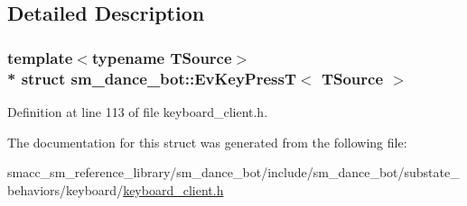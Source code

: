 \subsection{Detailed Description}
\subsubsection*{template$<$typename T\+Source$>$\\*
struct sm\+\_\+dance\+\_\+bot\+::\+Ev\+Key\+Press\+T$<$ T\+Source $>$}



Definition at line 113 of file keyboard\+\_\+client.\+h.



The documentation for this struct was generated from the following file\+:\begin{DoxyCompactItemize}
\item 
smacc\+\_\+sm\+\_\+reference\+\_\+library/sm\+\_\+dance\+\_\+bot/include/sm\+\_\+dance\+\_\+bot/substate\+\_\+behaviors/keyboard/\hyperlink{keyboard__client_8h}{keyboard\+\_\+client.\+h}\end{DoxyCompactItemize}
